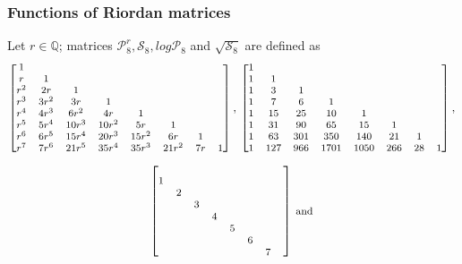 \documentclass[9pt]{beamer}
\begin{document}
\begin{frame}[fragile]
\frametitle{Functions of Riordan matrices}

    Let $r\in\mathbb{Q}$; matrices $\mathcal{P}_{8}^{r}, \mathcal{S}_{8},
    log{\mathcal{P}_{8}}$ and $\sqrt{\mathcal{S}_{8}}$ are defined as
    \begin{displaymath}
    \footnotesize
      \left[\begin{matrix}1 &   &   &   &   &   &   &  \\r & 1 &   &   &   &   &   &  \\r^{2} & 2 r & 1 &   &   &   &   &  \\r^{3} & 3 r^{2} & 3 r & 1 &   &   &   &  \\r^{4} & 4 r^{3} & 6 r^{2} & 4 r & 1 &   &   &  \\r^{5} & 5 r^{4} & 10 r^{3} & 10 r^{2} & 5 r & 1 &   &  \\r^{6} & 6 r^{5} & 15 r^{4} & 20 r^{3} & 15 r^{2} & 6 r & 1 &  \\r^{7} & 7 r^{6} & 21 r^{5} & 35 r^{4} & 35 r^{3} & 21 r^{2} & 7 r & 1\end{matrix}\right],\,
      \left[\begin{matrix}1 &  &  &  &  &  &  & \\1 & 1 &  &  &  &  &  & \\1 & 3 & 1 &  &  &  &  & \\1 & 7 & 6 & 1 &  &  &  & \\1 & 15 & 25 & 10 & 1 &  &  & \\1 & 31 & 90 & 65 & 15 & 1 &  & \\1 & 63 & 301 & 350 & 140 & 21 & 1 & \\1 & 127 & 966 & 1701 & 1050 & 266 & 28 & 1\end{matrix}\right],\\
    \end{displaymath}
    \begin{displaymath}
    \footnotesize
       \left[\begin{matrix}   &   &   &   &   &   &   &  \\1 &     &   &   &   &   &   &  \\  & 2 &     &   &   &   &   &  \\  &   & 3 &     &   &   &   &  \\  &   &   & 4 &     &   &   &  \\  &   &   &   & 5 &     &   &  \\  &   &   &   &   & 6 &     &  \\  &   &   &   &   &   & 7 &    \end{matrix}\right]\,\text{and}\,

\end{displaymath}
\end{frame}
\end{document}
